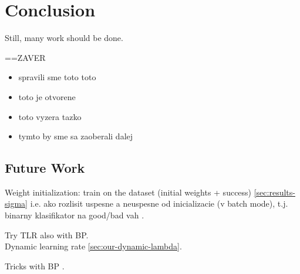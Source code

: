 \section*{Conclusion}
\label{sec:conclusion} 

Still, many work should be done. 


==ZAVER 
\begin{itemize} 
\item   spravili sme toto toto
\item   toto je otvorene
\item   toto vyzera tazko
\item   tymto by sme sa zaoberali dalej 
\end{itemize} 


\subsection*{Future Work} 
Weight initialization: train on the dataset (initial weights + success) \ref{sec:results-sigma} 
i.e. ako rozlisit uspesne a neuspesne od inicializacie (v batch mode), t.j. binarny klasifikator na good/bad vah . 

Try TLR also with BP.  \\ 

\label{sec:future-dlr} 
Dynamic learning rate \ref{sec:our-dynamic-lambda}. 

Tricks with BP \citep{lecun2012efficient}. 



